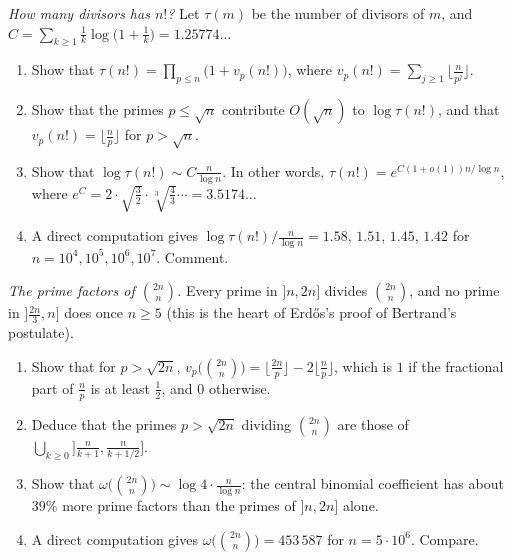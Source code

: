 \begin{exercise}[$\star\star$]\label{pb:factorialdiv}
\emph{How many divisors has $n!$?} Let $\tau(m)$ be the number of divisors of $m$, and $C=\sum_{k\ge1}\frac1k\log\bigl(1+\frac1k\bigr)=1.25774\ldots$
\begin{enumerate}[label=(\alph*)]
\item Show that $\tau(n!)=\prod_{p\le n}\bigl(1+v_p(n!)\bigr)$, where $v_p(n!)=\sum_{j\ge1}\lfloor\frac n{p^j}\rfloor$.
\item Show that the primes $p\le\sqrt n$ contribute $O(\sqrt n)$ to $\log\tau(n!)$, and that $v_p(n!)=\lfloor\frac np\rfloor$ for $p>\sqrt n$.
\item Show that $\log\tau(n!)\sim C\frac n{\log n}$. In other words, $\tau(n!)=e^{C(1+o(1))n/\log n}$, where $e^C=2\cdot\sqrt{\frac32}\cdot\sqrt[3]{\frac43}\cdots=3.5174\ldots$
\item A direct computation gives $\log\tau(n!)\big/\frac n{\log n}=1.58$, $1.51$, $1.45$, $1.42$ for $n=10^4,10^5,10^6,10^7$. Comment.
\end{enumerate}
\end{exercise}

\begin{exercise}[$\star\star$]\label{pb:centralbinom}
\emph{The prime factors of $\binom{2n}n$.} Every prime in $]n,2n]$ divides $\binom{2n}n$, and no prime in $]\frac{2n}3,n]$ does once $n\ge5$ (this is the heart of Erd\H os's proof of Bertrand's postulate).
\begin{enumerate}[label=(\alph*)]
\item Show that for $p>\sqrt{2n}$, $v_p\bigl(\binom{2n}n\bigr)=\lfloor\frac{2n}p\rfloor-2\lfloor\frac np\rfloor$, which is $1$ if the fractional part of $\frac np$ is at least $\frac12$, and $0$ otherwise.
\item Deduce that the primes $p>\sqrt{2n}$ dividing $\binom{2n}n$ are those of $\bigcup_{k\ge0}\bigl]\frac n{k+1},\frac n{k+1/2}\bigr]$.
\item Show that $\omega\bigl(\binom{2n}n\bigr)\sim\log4\cdot\frac n{\log n}$: the central binomial coefficient has about $39\%$ more prime factors than the primes of $]n,2n]$ alone.
\item A direct computation gives $\omega\bigl(\binom{2n}n\bigr)=453\,587$ for $n=5\cdot10^6$. Compare.
\end{enumerate}
\end{exercise}

